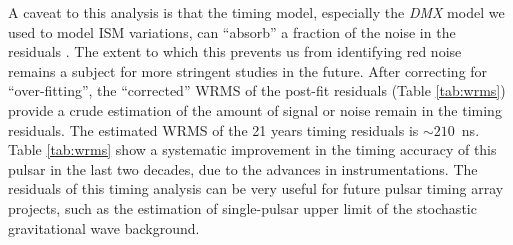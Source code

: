A caveat to this analysis is that the timing model, especially the
\textit{DMX} model we used to model ISM variations, can ``absorb'' a fraction
of the noise in the residuals \citep{kcs+13}. 
The extent to which this prevents us from
identifying red noise remains a subject for more stringent studies in the
future.
After correcting for ``over-fitting'', the ``corrected'' WRMS of the post-fit residuals (Table \ref{tab:wrms}) provide a crude estimation of
the amount of signal or noise remain in the timing residuals. The estimated
WRMS of the 21 years timing residuals is $\sim 210$~ns. 
Table \ref{tab:wrms} show a systematic improvement in the timing accuracy of
this pulsar in the last two decades, due to the advances in instrumentations.
The residuals of this timing analysis can be very useful for future pulsar timing array
projects, such as the estimation of single-pulsar upper limit of the stochastic gravitational wave background.



